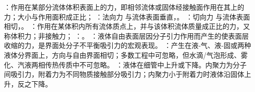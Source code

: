 ：作用在某部分流体体积表面上的力，即相邻流体或固体经接触面作用在其上的力；大小与作用面积成正比；
：法向力  与流体表面垂直，。
：切向力  与流体表面相切，。
：作用在某体积内所有流体质点上，并与该体积流体质量成正比的力，又称体积力；非接触力；
：。%
：液体自由表面层因分子引力作用而产生的使表面层收缩的力，是界面处分子不平衡吸引力的宏观表现。
：产生在液-气、液-固或两种液体分界面上，方向与自由界面相切；多数工程中可忽略，但水滴/气泡形成、雾化、汽液两相传热传质中不可忽略。
：液体在细管中上升或下降。内聚力为分子间吸引力，附着力为不同物质接触部分吸引力；内聚力小于附着力时液体沿固体上升，反之下降。

\divider
